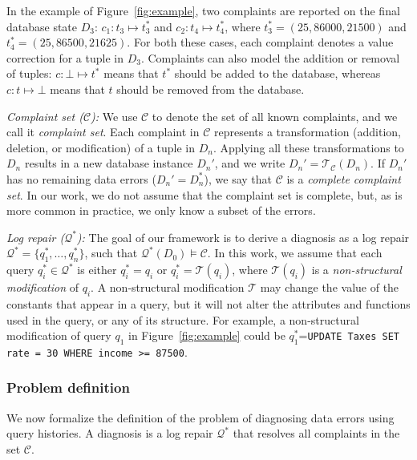 In the example of Figure~\ref{fig:example}, two complaints are reported on the final database state $D_3$: 
$c_1: t_3\mapsto t_3^*$ and
$c_2: t_4\mapsto t_4^*$, where $t_3^*=(25,86000,21500)$
and $t_4^*=(25,86500,21625)$.  For both these cases, each complaint denotes a value correction for a tuple in $D_3$.  Complaints can also model the addition or removal of tuples: $c: \bot\mapsto t^*$ means that $t^*$ should be added to the database, whereas $c: t\mapsto \bot$
means that $t$ should be removed from the database.


% 
\emph{Complaint set ($\mathcal{C}$):}
We use $\mathcal{C}$ to denote the set of all known complaints, and we call it
\emph{complaint set}. Each complaint in $\mathcal{C}$ represents a
transformation (addition, deletion, or modification) of a tuple in $D_n$.
Applying all these transformations to $D_n$ results in a new database instance
$D_n'$, and we write $D_n'=\mathcal{T}_\mathcal{C}(D_n)$. If $D_n'$ has no
remaining data errors ($D_n'=D_n^*$), we say that $\mathcal{C}$ is a
\emph{complete complaint set}.
In our work, we do not assume that the complaint set is complete, but, as is
more common in practice, we only know a subset of the errors.

\smallskip
\noindent
\emph{Log repair ($\mathcal{Q}^*$):}
The goal of our framework is to derive a diagnosis as a log repair
$\mathcal{Q}^*=\{q_1^*,\dots, q_n^*\}$, such that
$\mathcal{Q}^*(D_0)\models\mathcal{C}$. In this work, we assume that each
query $q_i^*\in\mathcal{Q}^*$ is either $q_i^*=q_i$ or
$q_i^*=\mathcal{T}(q_i)$, where $\mathcal{T}(q_i)$ is a \emph{non-structural
modification} of $q_i$.
A non-structural modification $\mathcal{T}$ may change the value of the
constants that appear in a query, but it will not alter the attributes and
functions used in the query, or any of its structure. For example, a
non-structural modification of query $q_1$ in Figure~\ref{fig:example} could
be $q_1^*$=\texttt{UPDATE Taxes SET rate = 30 WHERE income >= 87500}.


\subsubsection*{Problem definition}

We now formalize the definition of the problem of diagnosing data errors using
query histories. A diagnosis is a log repair $\mathcal{Q}^*$ that resolves all
complaints in the set $\mathcal{C}$.

